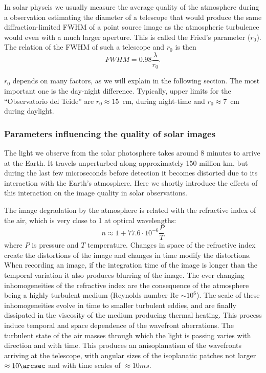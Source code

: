 In solar physcis we usually measure the average quality of the atmosphere during a observation estimating the diameter of a telescope that would produce the same diffraction-limited FWHM of a point source image as the atmospheric turbulence would even with a much larger aperture. This is called the Fried's parameter ($r_{0}$). The relation of the FWHM of such a telescope and $r_{0}$ is then
 \begin{equation}
FWHM=0.98\frac{\lambda}{r_{0}}.
\end{equation}


$r_{0}$ depends on many factors, as we will explain in the following section. The most important one is the day-night difference. Typically, upper limits for the ``Observatorio del Teide'' are $r_{0} \approx 15$\, cm, during night-time  and $r_{0} \approx 7$\, cm during daylight.


\subsubsection*{Parameters influencing the quality of solar images}
The light we observe from the solar photosphere takes around 8 minutes to arrive at the Earth. It travels unperturbed along approximately 150 million km, but during the last few microseconds before detection it becomes distorted due to its interaction with the Earth's atmosphere. Here we shortly introduce the effects of this interaction on the image quality in solar observations.




The image degradation by the atmosphere is related with the refractive index of the air, which is very close to 1 at optical wavelengths:
\begin{equation}
n \approx 1 +  77.6 \cdot 10^{-6} \frac{P}{T}
\end{equation}
where $P$ is pressure and $T$ temperature. Changes in space of the refractive index create the distortions of the image and changes in time modify the distortions. When recording an image, if the integration time of the image is longer than the temporal variation it also produces blurring of the image.
%
The ever changing inhomogeneities of the refractive index are the consequence of the atmosphere being a highly turbulent medium (Reynolds number Re $\sim 10^{6}$). 
The scale of these inhomogeneities evolve in time to smaller turbulent eddies, and are finally dissipated in the viscosity of the medium producing thermal heating. This process induce temporal and space dependence of the wavefront aberrations. 
%
The turbulent state of the air masses through which the light is passing varies with direction and with time. This produces an anisoplanatism of the wavefronts arriving at the telescope, with angular sizes of the isoplanatic patches not larger $\approx 10\arcsec$ and with time scales of $\approx 10 ms$.

